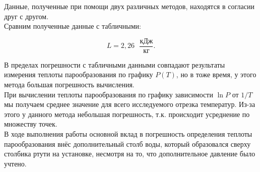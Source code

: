 \documentclass[a4paper, 12pt]{article}
\begin{document}
    \noindent Данные, полученные при помощи двух различных методов, находятся в согласии друг с другом. \\

    \noindent Сравним полученные данные с табличными:

    \[ L = 2,26 \text{ } \frac{\text{кДж}}{\text{кг}}. \]

    \noindent В пределах погрешности с табличными данными совпадают результаты измерения теплоты парообразования по графику $P(T)$, но в тоже время, у этого метода большая погрешность вычисления. \\

    \noindent При вычислении теплоты парообразования по графику зависимости $\ln P$ от $1/T$ мы получаем среднее значение для всего исследуемого отрезка температур. Из-за этого у данного метода небольшая погрешность, т.к. происходит усреднение по множеству точек. \\

    \noindent В ходе выполнения работы основной вклад в погрешность определения теплоты парообразования внёс дополнительный столб воды, который образовался сверху столбика ртути на установке, несмотря на то, что дополнительное давление было учтено.
\end{document}
